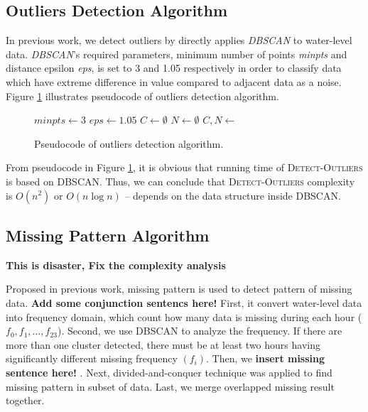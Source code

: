 \documentclass[conference]{IEEEtran}
\begin{document}
\subsection{Outliers Detection Algorithm}
In previous work, we detect outliers by directly applies \textit{DBSCAN} to water-level data. \textit{DBSCAN}'s required parameters, minimum number of points \textit{minpts} and distance epsilon \textit{eps}, is set to 3 and 1.05 respectively in order to classify data which have extreme difference in value compared to adjacent data as a noise. Figure \ref{fig:outliers_pseudocode} illustrates pseudocode of outliers detection algorithm.

\begin{figure}[H]
\begin{algorithmic}[1]
\State $minpts\gets3$
\State $eps\gets1.05 $
\State $C\gets\emptyset$
\State $N\gets\emptyset$
\State $C, N \gets $
\State {}
\EndProcedure
\end{algorithmic}
\caption{Pseudocode of outliers detection algorithm.}
\label{fig:outliers_pseudocode}
\end{figure}

From pseudocode in Figure \ref{fig:outliers_pseudocode}, it is obvious that running time of \textsc{Detect-Outliers} is based on \textsc{DBSCAN}. Thus, we can conclude that \textsc{Detect-Outliers} complexity is $O(n^2)$ or $O(n\log{n})$ -- depends on the data structure inside \textsc{DBSCAN}.

\subsection{Missing Pattern Algorithm}

\textbf{\color{red} This is disaster, Fix the complexity analysis}

Proposed in previous work, missing pattern is used to detect pattern of missing data. \textbf{\color{red}Add some conjunction sentencs here!} First, it convert water-level data into frequency domain, which count how many data is missing during each hour ($f_{0} ,f_{1}, \ldots, f_{23}$). Second, we use DBSCAN to analyze the frequency. If there are more than one cluster detected, there must be at least two hours having significantly different missing frequency $(f_{i})$. Then, we \textbf{\color{red} insert missing sentence here!} . Next, divided-and-conquer technique was applied to find missing pattern in subset of data. Last, we merge overlapped missing result together.
\end{document}
